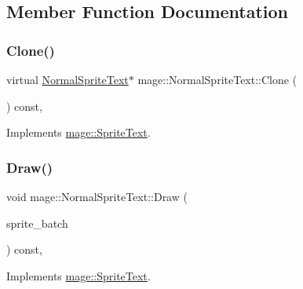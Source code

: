 \subsection{Member Function Documentation}
\hypertarget{classmage_1_1_normal_sprite_text_aef48e90667849cd9ec01510baf1394cb}{}\label{classmage_1_1_normal_sprite_text_aef48e90667849cd9ec01510baf1394cb} 
\subsubsection{\texorpdfstring{Clone()}{Clone()}}
{\footnotesize\ttfamily virtual \hyperlink{classmage_1_1_normal_sprite_text}{Normal\+Sprite\+Text}$\ast$ mage\+::\+Normal\+Sprite\+Text\+::\+Clone (\begin{DoxyParamCaption}{ }\end{DoxyParamCaption}) const\hspace{0.3cm}{\ttfamily [override]}, {\ttfamily [virtual]}}



Implements \hyperlink{classmage_1_1_sprite_text_ac4edf927911a9fb8e5c3a674b217637a}{mage\+::\+Sprite\+Text}.

\hypertarget{classmage_1_1_normal_sprite_text_ad2a1b02bea18afd6bf61b106a727a355}{}\label{classmage_1_1_normal_sprite_text_ad2a1b02bea18afd6bf61b106a727a355} 
\subsubsection{\texorpdfstring{Draw()}{Draw()}}
{\footnotesize\ttfamily void mage\+::\+Normal\+Sprite\+Text\+::\+Draw (\begin{DoxyParamCaption}\item[{\hyperlink{classmage_1_1_sprite_batch}{Sprite\+Batch} \&}]{sprite\+\_\+batch }\end{DoxyParamCaption}) const\hspace{0.3cm}{\ttfamily [override]}, {\ttfamily [virtual]}}



Implements \hyperlink{classmage_1_1_sprite_text_a45d5ac8410d5a46b26e8491946a2ad9e}{mage\+::\+Sprite\+Text}.

\hypertarget{classmage_1_1_normal_sprite_text_a1c0f30872c4d3114f1e53183958354e5}{}\label{classmage_1_1_normal_sprite_text_a1c0f30872c4d3114f1e53183958354e5} 
